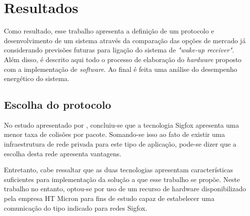 

\chapter{Resultados}
Como resultado, esse trabalho apresenta a definição de um protocolo e desenvolvimento de um sistema através da comparação das opções de mercado já considerando previsões futuras para ligação do sistema de \textit{"wake-up receiver"}. Além disso, é descrito aqui todo o processo de elaboração do \textit{hardware} proposto com a implementação de \textit{software}. Ao final é feita uma análise do desempenho energético do sistema.


\section{Escolha do protocolo}
No estudo apresentado por , concluiu-se que a tecnologia Sigfox apresenta uma menor taxa de colisões por pacote. Somando-se isso ao fato de existir uma infraestrutura de rede privada para este tipo de aplicação, pode-se dizer que a escolha desta rede apresenta vantagens.

Entretanto, cabe ressaltar que as duas tecnologias apresentam características suficientes para implementação da solução a que esse trabalho se propõe. Neste trabalho no entanto, optou-se por uso de um recurso de hardware disponibilizado pela empresa HT Micron para fins de estudo capaz de estabelecer uma comunicação do tipo indicado para redes Sigfox.

